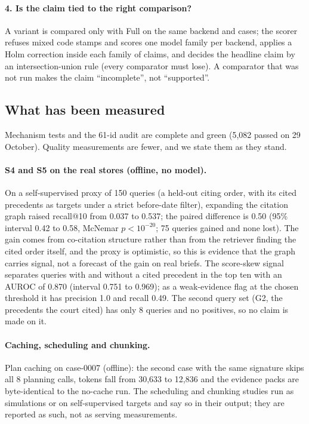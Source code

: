 \paragraph{4. Is the claim tied to the right comparison?} A variant is compared only with Full on the same backend and cases; the scorer refuses mixed code stamps and scores one model family per backend, applies a Holm correction inside each family of claims, and decides the headline claim by an intersection-union rule (every comparator must lose). A comparator that was not run makes the claim ``incomplete'', not ``supported''.

\subsection{What has been measured}

Mechanism tests and the 61-id audit are complete and green (5,082 passed on 29 October). Quality measurements are fewer, and we state them as they stand.

\paragraph{S4 and S5 on the real stores (offline, no model).} On a self-supervised proxy of 150 queries (a held-out citing order, with its cited precedents as targets under a strict before-date filter), expanding the citation graph raised recall@10 from 0.037 to 0.537; the paired difference is 0.50 (95\% interval 0.42 to 0.58, McNemar $p<10^{-20}$; 75 queries gained and none lost). The gain comes from co-citation structure rather than from the retriever finding the cited order itself, and the proxy is optimistic, so this is evidence that the graph carries signal, not a forecast of the gain on real briefs. The score-skew signal separates queries with and without a cited precedent in the top ten with an AUROC of 0.870 (interval 0.751 to 0.969); as a weak-evidence flag at the chosen threshold it has precision 1.0 and recall 0.49. The second query set (G2, the precedents the court cited) has only 8 queries and no positives, so no claim is made on it.

\paragraph{Caching, scheduling and chunking.} Plan caching on case-0007 (offline): the second case with the same signature skips all 8 planning calls, tokens fall from 30,633 to 12,836 and the evidence packs are byte-identical to the no-cache run. The scheduling and chunking studies run as simulations or on self-supervised targets and say so in their output; they are reported as such, not as serving measurements.

